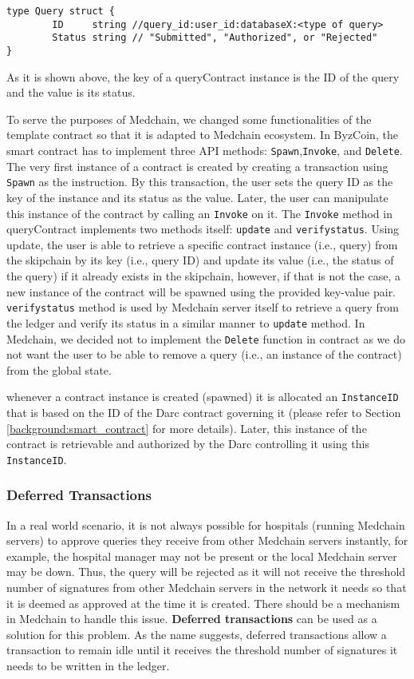 \begin{verbatim}
type Query struct {
	    ID     string //query_id:user_id:databaseX:<type of query>
	    Status string // "Submitted", "Authorized", or "Rejected"
} 
\end{verbatim}

As it is shown above, the key of a queryContract instance is the ID of the query and the value is its status.  

To serve the purposes of Medchain, we changed some functionalities of the template contract so that it is adapted to Medchain ecosystem. In ByzCoin, the smart contract has to implement three API methods: \texttt{Spawn},\texttt{Invoke}, and \texttt{Delete}. The very first instance of a contract is created by creating a transaction using \texttt{Spawn} as the instruction. By this transaction, the user sets the query ID as the key of the instance and its status as the value. Later, the user can manipulate this instance of the contract by calling an \texttt{Invoke} on it. The \texttt{Invoke} method in queryContract implements two methods itself: \texttt{update} and \texttt{verifystatus}. Using update, the user is able to retrieve a specific contract instance (i.e., query) from the skipchain by its key (i.e., query ID) and update its value (i.e., the status of the query) if it already exists in the skipchain, however, if that is not the case, a new instance of the contract will be spawned using the provided key-value pair. \texttt{verifystatus} method is used by Medchain server itself to retrieve a query from the ledger and verify its status in a similar manner to \texttt{update} method. In Medchain, we decided not to implement the \texttt{Delete} function in contract as we do not want the user to be able to remove a query (i.e., an instance of the contract) from the global state. 

whenever a contract instance is created (spawned) it is allocated an \texttt{InstanceID} that is based on the ID of the Darc contract governing it (please refer to Section \ref{background:smart_contract} for more details). Later, this instance of the contract is retrievable and authorized by the Darc controlling it using this \texttt{InstanceID}. 

\subsubsection{Deferred Transactions} \label{impl:deferred_tx}
In a real world scenario, it is not always possible for hospitals (running Medchain servers) to approve queries they receive from other Medchain servers instantly, for example, the hospital manager may not be present or the local Medchain server may be down. Thus, the query will be rejected as it will not receive the threshold number of signatures from other Medchain servers in the network it needs so that it is deemed as approved at the time it is created. There should be a mechanism in Medchain to handle this issue. \textbf{Deferred transactions} can be used as a solution for this problem. As the name suggests, deferred transactions allow a transaction to remain idle until it receives the threshold number of signatures it needs to be written in the ledger.  

